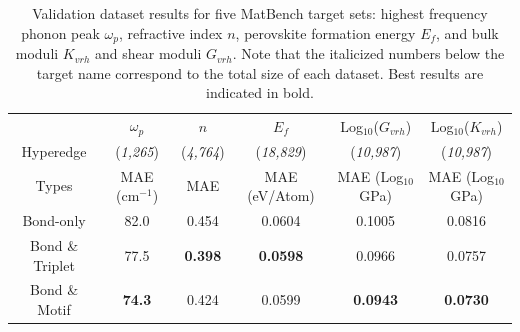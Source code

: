 \documentclass[twoside,twocolumn,9pt]{article}
\begin{document}



\begin{table}\small
	\begin{tabular*}{\textwidth}{@{\extracolsep{\fill}}cccccc}
		\hline 
		$\quad$ & $\omega_p$  & $n$  & $E_f$  & Log$_{10}$($G_{vrh}$) & Log$_{10}$($K_{vrh}$) \\
		Hyperedge & (\textit{1,265}) &  (\textit{4,764}) & (\textit{18,829}) & (\textit{10,987}) & (\textit{10,987}) \\
		Types & MAE (cm$^{-1}$) & MAE & MAE (eV/Atom)& MAE (Log$_{10}$GPa)& MAE (Log$_{10}$GPa)  \\
		\hline
		Bond-only & 82.0& 0.454 & 0.0604 & 0.1005 & 0.0816\\
		Bond \& Triplet & 77.5& \textbf{0.398} & \textbf{0.0598} & 0.0966 & 0.0757 \\
		Bond \& Motif & \textbf{74.3}& 0.424 & 0.0599 & \textbf{0.0943} & \textbf{0.0730}\\
		\hline
	\end{tabular*}
	\caption{Validation dataset results for five MatBench target sets: highest frequency phonon peak $\omega_p$, refractive index $n$, perovskite formation energy $E_f$, and bulk moduli $K_{vrh}$ and shear moduli $G_{vrh}$. Note that the italicized numbers below the target name correspond to the total size of each dataset. Best results are indicated in bold.}\label{fig:matbench_table}
\end{table}
\end{document}
